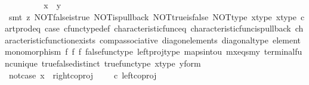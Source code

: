 \begin{isabellebody}
\ \ \ \ \ \ \isamarkupfalse%
\ \isamarkupfalse%
\ {\isachardoublequoteopen}x\ {\isacharequal}{\kern0pt}\ y{\isachardoublequoteclose}\isanewline
\ \ \ \ \ \ \ \ \isamarkupfalse%
\ {\isacharparenleft}{\kern0pt}smt\ {\isacharparenleft}{\kern0pt}z{}{\isacharparenright}{\kern0pt}\ NOT{\isacharunderscore}{\kern0pt}false{\isacharunderscore}{\kern0pt}is{\isacharunderscore}{\kern0pt}true\ NOT{\isacharunderscore}{\kern0pt}is{\isacharunderscore}{\kern0pt}pullback\ NOT{\isacharunderscore}{\kern0pt}true{\isacharunderscore}{\kern0pt}is{\isacharunderscore}{\kern0pt}false\ NOT{\isacharunderscore}{\kern0pt}type\ x{\isacharunderscore}{\kern0pt}type\ x{\isacharunderscore}{\kern0pt}type{\isacharprime}{\kern0pt}\ cart{\isacharunderscore}{\kern0pt}prod{\isacharunderscore}{\kern0pt}eq{}\ case{}\ cfunc{\isacharunderscore}{\kern0pt}type{\isacharunderscore}{\kern0pt}def\ characteristic{\isacharunderscore}{\kern0pt}func{\isacharunderscore}{\kern0pt}eq\ characteristic{\isacharunderscore}{\kern0pt}func{\isacharunderscore}{\kern0pt}is{\isacharunderscore}{\kern0pt}pullback\ characteristic{\isacharunderscore}{\kern0pt}function{\isacharunderscore}{\kern0pt}exists\ comp{\isacharunderscore}{\kern0pt}associative\ diag{\isacharunderscore}{\kern0pt}on{\isacharunderscore}{\kern0pt}elements\ diagonal{\isacharunderscore}{\kern0pt}type\ element{\isacharunderscore}{\kern0pt}monomorphism\ f{}\ f{}\ f{}\ false{\isacharunderscore}{\kern0pt}func{\isacharunderscore}{\kern0pt}type\ left{\isacharunderscore}{\kern0pt}proj{\isacharunderscore}{\kern0pt}type\ maps{\isacharunderscore}{\kern0pt}into{\isacharunderscore}{\kern0pt}{}u{}\ mx{\isacharunderscore}{\kern0pt}eqs{\isacharunderscore}{\kern0pt}my\ terminal{\isacharunderscore}{\kern0pt}func{\isacharunderscore}{\kern0pt}unique\ true{\isacharunderscore}{\kern0pt}false{\isacharunderscore}{\kern0pt}distinct\ true{\isacharunderscore}{\kern0pt}func{\isacharunderscore}{\kern0pt}type\ x{\isacharunderscore}{\kern0pt}type\ y{\isacharunderscore}{\kern0pt}form{\isacharparenright}{\kern0pt}\isanewline
\ \ \ \ \isamarkupfalse%
\isanewline
\ \ \ \ \ \ \isamarkupfalse%
\ not{\isacharunderscore}{\kern0pt}case{}{\isacharcolon}{\kern0pt}\ {\isachardoublequoteopen}x\ {\isasymnoteq}\ right{\isacharunderscore}{\kern0pt}coproj\ {\isasymone}\ {\isacharparenleft}{\kern0pt}{\isasymone}\ {\isasymCoprod}\ {\isasymone}{\isacharparenright}{\kern0pt}\ {\isasymcirc}\isactrlsub c\ left{\isacharunderscore}{\kern0pt}coproj\ {\isasymone}\ {\isasymone}{\isachardoublequoteclose}\isanewline

\end{isabellebody}
